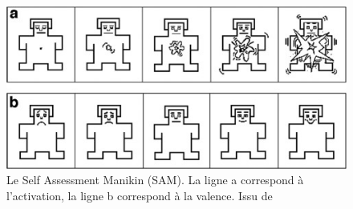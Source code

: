 \begin{figure}[h]
  \centering
  \includegraphics[width=12cm]{./Chapitre4/figures/sam.jpeg}
  \caption{Le Self Assessment Manikin (SAM). La ligne a correspond à l'activation, la ligne b correspond à la valence. Issu de~\cite{Bradley1994}}
  \label{fig:SAM}
\end{figure}

